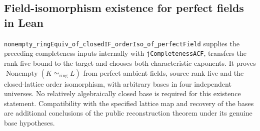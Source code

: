 \documentclass[11pt,oneside]{article}
\theoremstyle{definition}
\theoremstyle{remark}
\newcommand{\lean}[1]{\nolinkurl{#1}}
\begin{document}
\subsection{Field-isomorphism existence for perfect fields in Lean}

\lean{nonempty_ringEquiv_of_closedIF_orderIso_of_perfectField} supplies the
preceding completeness inputs internally with \lean{jCompletenessACF}, transfers
the rank-five bound to the target and chooses both characteristic exponents.
It proves $\operatorname{Nonempty}(K\simeq_{\mathrm{ring}}L)$ from perfect
ambient fields, source rank five and the closed-lattice order isomorphism,
with arbitrary bases in four independent universes. No relatively algebraically
closed base is required for this existence statement. Compatibility with the
specified lattice map and recovery of the bases are additional conclusions of
the public reconstruction theorem under its genuine base hypotheses.

\end{document}

